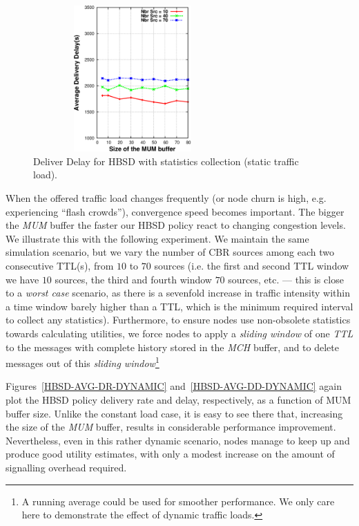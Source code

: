 \begin{figure}[!h]
  \begin{center}
    \includegraphics[width=3in,height=2.2in]{Chapitre3/fig14.eps}
  \end{center}
  \caption{Deliver Delay for HBSD with statistics collection (static traffic load).}
  \label{HBSD-AVG-DD-MUM}
\end{figure}

When the offered traffic load changes frequently (or node churn is high, e.g. experiencing ``flash crowds''), convergence speed becomes important. The bigger the \emph{MUM} buffer the faster our HBSD policy react to changing congestion levels. We illustrate this with the following experiment. We maintain the same simulation scenario, but we vary the number of CBR sources among each two consecutive TTL(s), from $10$ to $70$ sources (i.e. the first and second TTL window we have $10$ sources, the third and fourth window $70$ sources, etc. --- this is close to a \emph{worst case} scenario, as there is a sevenfold increase in traffic intensity within a time window barely higher than a TTL, which is the minimum required interval to collect any statistics). Furthermore, to ensure nodes use non-obsolete statistics towards calculating utilities, we force nodes to apply a \emph{sliding window} of one \emph{TTL} to the messages with complete history stored in the \emph{MCH} buffer, and to delete messages out of this \emph{sliding window}\footnote{A running average could be used for smoother performance. We only care here to demonstrate the effect of dynamic traffic loads.}

Figures~\ref{HBSD-AVG-DR-DYNAMIC} and~\ref{HBSD-AVG-DD-DYNAMIC} again plot the HBSD policy delivery rate and delay, respectively, as a function of MUM buffer size. Unlike the constant load case, it is easy to see there that, increasing the size of the \emph{MUM} buffer, results in considerable performance improvement. Nevertheless, even in this rather dynamic scenario, nodes manage to keep up and produce good utility estimates, with only a modest increase on the amount of signalling overhead required.

